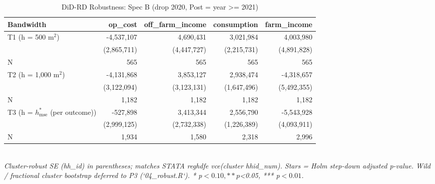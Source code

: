 \begin{table}[t]
\centering
\caption{DiD-RD Robustness: Spec B (drop 2020, Post = year >= 2021)}
\label{tab:specB}
\begin{tabular}{lrrrr}
\toprule
Bandwidth & op\_cost & off\_farm\_income & consumption & farm\_income \\
\midrule
T1 (h = 500 m$^2$) & -4,537,107 & 4,690,431 & 3,021,984 & 4,003,980 \\
        & (2,865,711) & (4,447,727) & (2,215,731) & (4,891,828) \\
N       & 565 & 565 & 565 & 565 \\
T2 (h = 1,000 m$^2$) & -4,131,868 & 3,853,127 & 2,938,474 & -4,318,657 \\
        & (3,122,094) & (3,123,131) & (1,647,496) & (5,492,355) \\
N       & 1,182 & 1,182 & 1,182 & 1,182 \\
T3 (h = $h^{*}_{\mathrm{mse}}$ (per outcome)) & -527,898 & 3,413,344 & 2,556,790 & -5,543,928 \\
        & (2,999,125) & (2,732,338) & (1,226,389) & (4,093,911) \\
N       & 1,934 & 1,580 & 2,318 & 2,996 \\
\bottomrule
\end{tabular}
\\
\footnotesize\textit{Cluster-robust SE (hh\_id) in parentheses; matches STATA reghdfe vce(cluster hhid\_num). Stars = Holm step-down adjusted p-value. Wild / fractional cluster bootstrap deferred to P3 (`04\_robust.R`). * p$<0.10, ** p$<0.05, *** p$<0.01$.}
\end{table}

